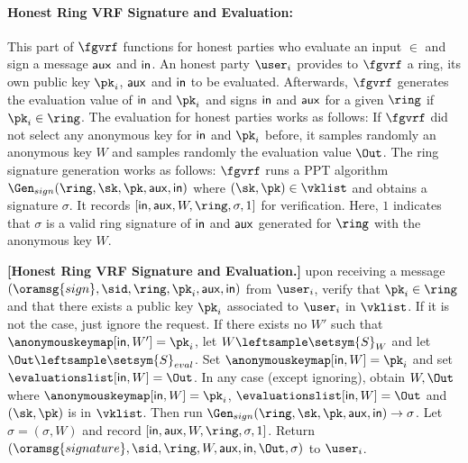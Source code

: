 \paragraph{Honest Ring VRF Signature and Evaluation:} This part of $ \fgvrf $ functions for honest parties who evaluate an input $ \in $ and sign a message $ \mathsf{aux} $ and $ \mathsf{in} $. An honest party $ \user_i $  provides to $ \fgvrf $ a ring, its own public key $ \pk_i $, $ \mathsf{aux} $ and  $ \mathsf{in} $ to be  evaluated. Afterwards, $ \fgvrf $ generates the evaluation value of $ \mathsf{in} $ and $ \pk_i $ and signs $ \mathsf{in} $ and $ \mathsf{aux} $ for a given $ \ring $ if $ \pk_i \in \ring $. The evaluation for honest parties works as follows: If $ \fgvrf $ did not select any anonymous key for $ \mathsf{in} $ and $ \pk_i $ before, it samples randomly an anonymous key $ W $ and samples randomly the evaluation value $ \Out $. The ring signature generation works as follows:  $ \fgvrf $ runs a PPT algorithm $ \Gen_{sign}(\ring, \sk,\pk,\aux,\msg) $ where $ (\sk,\pk) \in \vklist $ and obtains a signature $ \sigma $. It records $  [\msg,\aux, W, \ring,\sigma, 1]  $ for verification. Here, $ 1 $ indicates that $ \sigma  $ is a valid ring signature of $ \mathsf{in} $ and $ \mathsf{aux} $ generated for $ \ring $ with the anonymous key $ W $.

\begin{tcolorbox}[left=2pt,right=2pt]
	\eprint{}{\small}
	\textbf{[Honest Ring VRF Signature and Evaluation.]} upon receiving a message $(\oramsg{sign}, \sid, \ring, \pk_i,\aux, \msg)$ from $\user_i$, verify that $\pk_i \in \ring$ and that there exists a public key $\pk_i$ associated to $\user_i$ in $ \vklist $. If it is not the case, just ignore the request. 	
	If there exists no $ W' $ such that $ \anonymouskeymap[\msg,W'] =  \pk_i $, let $ W \leftsample \setsym{S}_W $ and let $\Out \leftsample \setsym{S}_{eval}$. Set $ \anonymouskeymap[\msg,W] = \pk_i $ and set $ \evaluationslist[\msg, W] = \Out$.
	In any case (except ignoring), obtain $ W, \Out$ where $ \anonymouskeymap[\msg,W] =\pk_i $, $ \evaluationslist[\msg, W] = \Out$ and  $ (\sk, \pk) $ is in $\vklist $. Then run  $ \Gen_{sign}(\ring,\sk,\pk,\aux,\msg) \rightarrow \sigma $.
	Let $ \sigma = (\sigma,W)$ and record $ [\msg,\aux, W, \ring,\sigma, 1] $. Return $(\oramsg{signature}, \sid, \ring,W,\aux,\msg, \Out, \sigma)$ to $\user_i$.
\end{tcolorbox}






